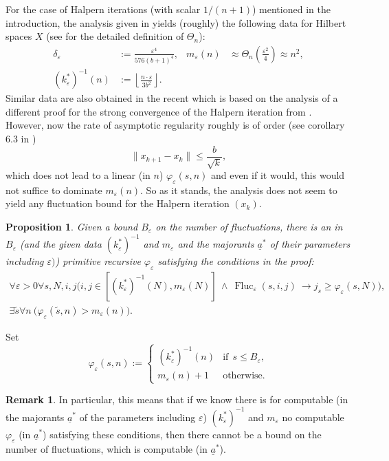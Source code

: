 \documentclass[1p]{elsarticle}
\DeclareMathOperator{\Fluc}{Fluc}
\newcommand{\tup}{\underline} %
\newcommand{\Tif}{\text{if}\ }
\newcommand{\Telse}{\text{otherwise}}
\theoremstyle{plain}
\newtheorem{prop}[thm]{Proposition}
\theoremstyle{definition}
\newtheorem{rmk}[thm]{Remark}
\theoremstyle{remark}
\renewenvironment{proof}[1][]{\noindent{\bf Proof{#1}. }}{\nopagebreak[4]{\hspace*{\fill}
  $\Box$              %
 }{\vspace{2ex}}}
\renewcommand{\phi}{\varphi}
\renewcommand{\epsilon}{\varepsilon}
\theoremstyle{definition}
\begin{document}
{For the case of Halpern iterations (with scalar $1/(n+1)$) mentioned in 
the introduction, the analysis given in \cite{Kohlenbach/Leustean6}   
yields (roughly) the following data for Hilbert spaces $X$ 
(see \cite{Kohlenbach/Leustean6,Addendum} for the 
detailed definition of $\Theta_n$):
\begin{align*}
\delta_\epsilon &:= \frac{\epsilon^4}{576(b+1)^4},& m_\epsilon(n)&\approx \Theta_n(\frac{\epsilon^2}{4})\approx n^2,\\
(k^*_\epsilon)^{-1}(n)&:=\left\lfloor\frac{n\cdot\epsilon}{3b^2}
\right\rfloor.& 
\end{align*}
Similar data are also obtained  
in the recent \cite{Koernlein} which is based on the analysis of a different 
proof for the strong convergence of the Halpern iteration from 
\cite{Xu}.\\
However, now the rate of asymptotic regularity roughly is of order (see 
corollary 6.3 in \cite{Kohlenbach/Leustean6}) 
\[ \| x_{k+1}-x_k\| \le \frac{b}{\sqrt{k}}, \] 
which does not lead to a linear (in $n$) $\varphi_{\varepsilon}(s,n)$ and 
even if it would, this would not suffice to dominate $m_{\varepsilon}(n).$ 
So as it stands, the analysis does not seem to yield any fluctuation 
bound for the Halpern iteration $(x_k).$

\begin{prop}
Given a bound $B_{\varepsilon}$ on the number of fluctuations, there is an in $B_{\varepsilon}$ (and the given data 
$(k^*_{\varepsilon})^{-1}$ and $m_{\varepsilon}$ and the majorants $\underline{a}^*$ of their parameters including $\varepsilon)$) 
primitive recursive $\phi_\epsilon$
satisfying the conditions in the proof:
\begin{align}
\forall \varepsilon >0 \forall s,N,i,j \big( i,j\in[(k^*_\epsilon)^{-1}(N),
m_\epsilon(N)]\ \wedge\ \Fluc_{\varepsilon}(s,i,j)\ 
\rightarrow j_s\geq \phi_\epsilon(s,N) \big),\label{e:FU1}\\
\exists \tilde s\forall n\ \big(\phi_\epsilon(\tilde s,n)>m_\epsilon(n)\big).\label{e:FU2}
\end{align}
\end{prop}
\begin{proof}
Set
\[
\phi_\epsilon(s,n):=\begin{cases}
(k^*_\epsilon)^{-1}(n)&\Tif\ s\leq B_{\varepsilon},\\
m_\epsilon(n)+1&\Telse.
\end{cases}
\]
\end{proof}
\vspace*{-3mm}
\begin{rmk}
In particular, this means that if we know there is for computable 
(in the majorants $\underline{a}^*$ of the parameters including $\varepsilon$) 
$(k^*_{\varepsilon})^{-1}$ and $m_{\varepsilon}$ 
no computable $\phi_{\varepsilon}$ (in $\tup a^*$) satisfying these conditions,
then there cannot be a bound on the number of fluctuations, which is computable (in $\tup a^*$).
\end{rmk}


}
\end{document}
